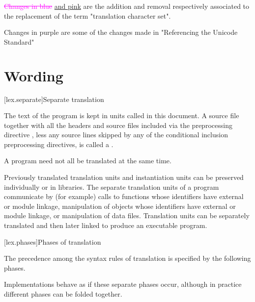 \documentclass{wg21}
\newcommand{\addedTranslation}[1]{\textcolor{addclrTwo}{\uline{#1}}}
\newcommand{\removedTranslation}[1]{\textcolor{magenta}{\sout{#1}}}
\newcommand{\changedTranslation}[2]{\removedTranslation{#1} \addedTranslation{#2}}
\newcommand{\changeducs}[1]{\textcolor{noteclr}{#1}}
\begin{document}
\changedTranslation{Changes in blue}{and pink} are the addition and removal respectively associated to the replacement of the term "translation character set".

\changeducs{Changes in purple} are some of the changes made in "Referencing the Unicode Standard"

\section{Wording}

[lex.separate]{Separate translation}

\pnum
{}%
%
The text of the program is kept in units called
 in this document.
A source file together with all the headers
and source files included via the preprocessing
directive , less any source lines skipped by any of the
conditional inclusion preprocessing directives, is
called a .
\begin{note}
    A \Cpp{} program need not all be translated at the same time.
\end{note}

\pnum
\begin{note}
    Previously translated translation units and instantiation
    units can be preserved individually or in libraries. The separate
    translation units of a program communicate by (for
    example)
    calls to functions whose identifiers have external or module linkage,
    manipulation of objects whose identifiers have external or module linkage, or
    manipulation of data files. Translation units can be separately
    translated and then later linked to produce an executable
    program.
\end{note}

[lex.phases]{Phases of translation}%

\pnum
{}%
The precedence among the syntax rules of translation is specified by the
following phases.
\begin{wfootnote}
    Implementations behave as if these separate phases
    occur, although in practice different phases can be folded together.
\end{wfootnote}
\end{document}
